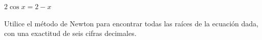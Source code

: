 \item $2 \cos x = 2 - x$
\par
Utilice el método de Newton para encontrar todas las raíces de la ecuación dada, con una exactitud de seis cifras decimales.
